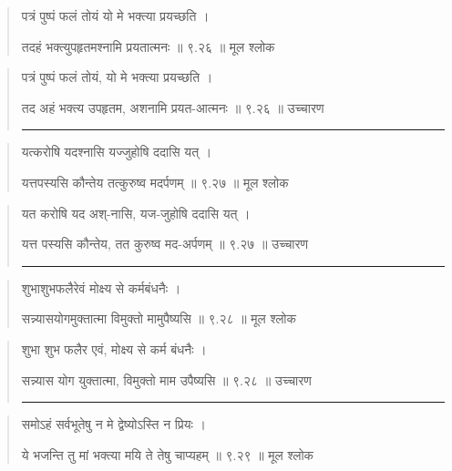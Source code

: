 \begin{quotation} 

पत्रं पुष्पं फलं तोयं यो मे भक्त्या प्रयच्छति  ।  

तदहं भक्त्युपहृतमश्नामि प्रयतात्मनः  ॥ ९.२६ ॥  मूल श्लोक
\end{quotation}

\begin{quotation}

पत्रं पुष्पं फलं तोयं, यो मे भक्त्या प्रयच्छति  ।  

तद अहं भक्त्य उपहृतम, अशनामि प्रयत-आत्मनः  ॥ ९.२६ ॥  उच्चारण

\noindent\rule{16cm}{0.4pt} 
\end{quotation}


\begin{quotation} 

यत्करोषि यदश्नासि यज्जुहोषि ददासि यत्‌  ।  

यत्तपस्यसि कौन्तेय तत्कुरुष्व मदर्पणम्‌  ॥ ९.२७ ॥  मूल श्लोक
\end{quotation}

\begin{quotation}

यत करोषि यद अश्-नासि, यज-जुहोषि ददासि यत्‌  ।  

यत्त पस्यसि कौन्तेय, तत कुरुष्व मद-अर्पणम्‌  ॥ ९.२७ ॥  उच्चारण

\noindent\rule{16cm}{0.4pt} 
\end{quotation}


\begin{quotation} 

शुभाशुभफलैरेवं मोक्ष्य से कर्मबंधनैः  ।  

सन्न्यासयोगमुक्तात्मा विमुक्तो मामुपैष्यसि  ॥ ९.२८ ॥  मूल श्लोक
\end{quotation}

\begin{quotation}

शुभा शुभ फलैर एवं, मोक्ष्य से कर्म बंधनैः  ।  

सन्न्यास योग युक्तात्मा, विमुक्तो माम उपैष्यसि  ॥ ९.२८ ॥  उच्चारण

\noindent\rule{16cm}{0.4pt} 
\end{quotation}


\begin{quotation} 
समोऽहं सर्वभूतेषु न मे द्वेष्योऽस्ति न प्रियः  ।  

ये भजन्ति तु मां भक्त्या मयि ते तेषु चाप्यहम्‌  ॥ ९.२९ ॥  मूल श्लोक
\end{quotation}

